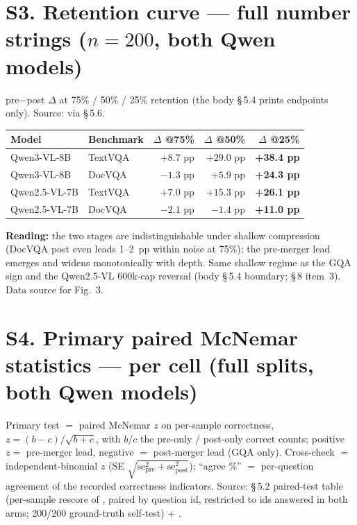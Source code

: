 \documentclass[sigconf,review,anonymous]{acmart}
\begin{document}
\section*{S3. Retention curve --- full number strings ($n = 200$, both Qwen models)}

pre$-$post $\Delta$ at 75\% / 50\% / 25\% retention (the body \S\,5.4 prints
endpoints only). Source:  via
 \S\,5.6.

\begin{table}[h]
  \centering
  \small
  \begin{tabular}{@{}l l r r r@{}}
    \toprule
    Model & Benchmark & $\Delta$ @75\% & $\Delta$ @50\% & $\Delta$ @25\% \\
    \midrule
    Qwen3-VL-8B   & TextVQA & $+8.7$ pp  & $+29.0$ pp & \textbf{+38.4 pp} \\
    Qwen3-VL-8B   & DocVQA  & $-1.3$ pp  & $+5.9$ pp  & \textbf{+24.3 pp} \\
    Qwen2.5-VL-7B & TextVQA & $+7.0$ pp  & $+15.3$ pp & \textbf{+26.1 pp} \\
    Qwen2.5-VL-7B & DocVQA  & $-2.1$ pp  & $-1.4$ pp  & \textbf{+11.0 pp} \\
    \bottomrule
  \end{tabular}
\end{table}

\noindent\textbf{Reading:} the two stages are indistinguishable under shallow
compression (DocVQA post even leads 1--2~pp within noise at 75\%); the
pre-merger lead emerges and widens monotonically with depth. Same shallow
regime as the GQA sign and the Qwen2.5-VL 600k-cap reversal (body \S\,5.4
boundary; \S\,8 item~3). Data source for Fig.~3.

\section*{S4. Primary paired McNemar statistics --- per cell (full splits, both Qwen models)}

Primary test $=$ paired McNemar $z$ on per-sample correctness,
$z = (b - c)/\sqrt{b + c}$, with $b/c$ the pre-only / post-only correct counts;
positive $z =$ pre-merger lead, negative $=$ post-merger lead (GQA only).
Cross-check $=$ independent-binomial $z$ (SE $\sqrt{\mathrm{se}^2_{\mathrm{pre}}
+ \mathrm{se}^2_{\mathrm{post}}}$); ``agree \%'' $=$ per-question agreement of
the recorded correctness indicators. Source:  \S\,5.2
paired-test table (per-sample rescore of ,
paired by question id, restricted to ids answered in both arms; 200/200
ground-truth self-test) + .
\end{document}
